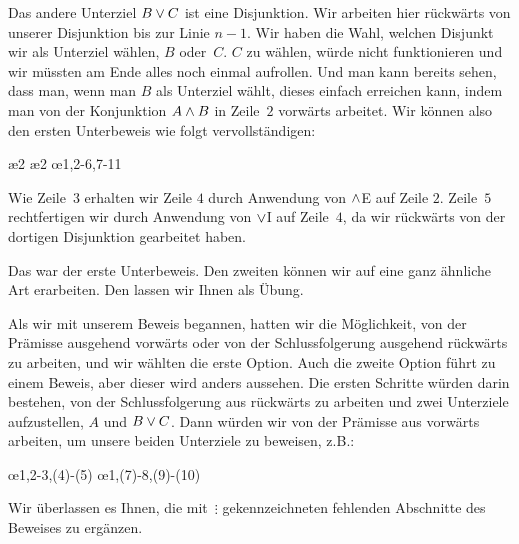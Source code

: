 Das andere Unterziel $B \vee C$ ist eine Disjunktion. Wir arbeiten hier rückwärts von unserer Disjunktion bis zur Linie $n-1$. Wir haben die Wahl, welchen Disjunkt wir als Unterziel wählen, $B$ oder~$C$. $C$ zu wählen, würde nicht funktionieren und wir müssten am Ende alles noch einmal aufrollen. Und man kann bereits sehen, dass man, wenn man $B$ als Unterziel wählt, dieses einfach erreichen kann, indem man von der Konjunktion $A \wedge B$ in Zeile~$2$ vorwärts arbeitet. Wir können also den ersten Unterbeweis wie folgt vervollständigen:
\begin{fitchproof}
	\open
	\ae{2}
	\ae{2}
	\close
	\open
	\ellipsesline
	\close
	\oe{1,2-6,7-11}
\end{fitchproof}
Wie Zeile~$3$ erhalten wir Zeile $4$ durch Anwendung von $\wedge$E auf Zeile $2$. Zeile~$5$ rechtfertigen wir durch Anwendung von $\vee$I auf Zeile~$4$, da wir rückwärts von der dortigen Disjunktion gearbeitet haben.

Das war der erste Unterbeweis. Den zweiten können wir auf eine ganz ähnliche Art erarbeiten. Den lassen wir Ihnen als Übung.

Als wir mit unserem Beweis begannen, hatten wir die Möglichkeit, von der Prämisse ausgehend vorwärts oder von der Schlussfolgerung ausgehend rückwärts zu arbeiten, und wir wählten die erste Option. Auch die zweite Option führt zu einem Beweis, aber dieser wird anders aussehen. Die ersten Schritte würden darin bestehen, von der Schlussfolgerung aus rückwärts zu arbeiten und zwei Unterziele aufzustellen, $A$ und $B \vee C$. Dann würden wir von der Prämisse aus vorwärts arbeiten, um unsere beiden Unterziele zu beweisen, z.B.\@:
\begin{fitchproof}
	\open
	\ellipsesline
	\close
	\open
	\ellipsesline
	\close
	\oe{1,2-3,(4)-(5)}
	\open
	\ellipsesline
	\close
	\open
	\ellipsesline
	\close
	\oe{1,(7)-8,(9)-(10)}	
\end{fitchproof}
Wir überlassen es Ihnen, die mit~$\vdots$ gekennzeichneten fehlenden Abschnitte des Beweises zu ergänzen.

